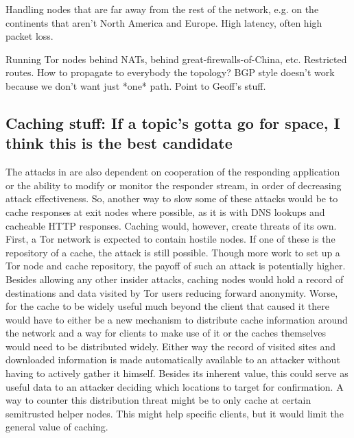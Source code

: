 \documentclass{llncs}
\begin{document}
Handling nodes that are far away from the rest of the network, e.g. on
the continents that aren't North America and Europe. High latency,
often high packet loss.

Running Tor nodes behind NATs, behind great-firewalls-of-China, etc.
Restricted routes. How to propagate to everybody the topology? BGP
style doesn't work because we don't want just *one* path. Point to
Geoff's stuff.

\subsection{Caching stuff: If a topic's gotta go for space, I think this
is the best candidate}

The attacks in \cite{attack-tor-oak05} are also dependent on
cooperation of the responding application or the ability to modify or
monitor the responder stream, in order of decreasing attack
effectiveness.  So, another way to slow some of these attacks
would be to cache responses at exit nodes where possible, as it is with
DNS lookups and cacheable HTTP responses.  Caching would, however,
create threats of its own. First, a Tor network is expected to contain
hostile nodes. If one of these is the repository of a cache, the
attack is still possible. Though more work to set up a Tor node and
cache repository, the payoff of such an attack is potentially
higher.
%
Besides allowing any other insider attacks, caching nodes would hold a
record of destinations and data visited by Tor users reducing forward
anonymity. Worse, for the cache to be widely useful much beyond the
client that caused it there would have to either be a new mechanism to
distribute cache information around the network and a way for clients
to make use of it or the caches themselves would need to be
distributed widely. Either way the record of visited sites and
downloaded information is made automatically available to an attacker
without having to actively gather it himself.  Besides its inherent
value, this could serve as useful data to an attacker deciding which
locations to target for confirmation. A way to counter this
distribution threat might be to only cache at certain semitrusted
helper nodes.  This might help specific clients, but it would limit
the general value of caching.
\end{document}
